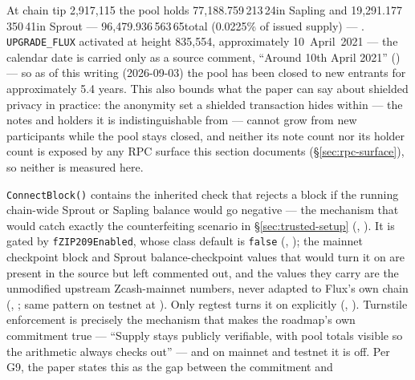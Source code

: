 \begin{description}
  At chain tip 2{,}917{,}115 the pool holds 77{,}188.759\,213\,24\flux in Sapling and 19{,}291.177\,350\,41\flux in
  Sprout — 96{,}479.936\,563\,65\flux total (0.0225\% of issued supply) —
  .
  \texttt{UPGRADE\_FLUX} activated at height 835{,}554, approximately 10~April~2021 — the calendar
  date is carried only as a source comment, ``Around 10th April 2021''
  () — so as of this
  writing (2026-09-03) the pool has been closed to new entrants for approximately 5.4 years. This
  also bounds what the paper can say about shielded privacy in practice: the anonymity set a shielded
  transaction hides within — the notes and holders it is indistinguishable from — cannot grow from new
  participants while the pool stays closed, and neither its note count nor its holder count is exposed
  by any RPC surface this section documents (\S\ref{sec:rpc-surface}), so neither is measured here.
\item[Turnstile enforcement (ZIP-209) is compiled in but dormant.] \texttt{ConnectBlock()} contains
  the inherited check that rejects a block if the running chain-wide Sprout or Sapling balance would
  go negative — the mechanism that would catch exactly the counterfeiting scenario in
  \S\ref{sec:trusted-setup} (\shipped, ). It is gated by
  \texttt{fZIP209Enabled}, whose class default is \texttt{false} (\shipped,
  ); the mainnet checkpoint block and Sprout balance-checkpoint
  values that would turn it on are present in the source but left commented out, and the values they
  carry are the unmodified upstream Zcash-mainnet numbers, never adapted to Flux's own chain (\shipped,
  ; same pattern on testnet at
  ). Only regtest turns it on explicitly (\shipped,
  ). Turnstile enforcement is precisely the mechanism that
  makes the roadmap's own commitment true — ``Supply stays publicly verifiable, with pool totals
  visible so the arithmetic always checks out''  — and on
  mainnet and testnet it is off. Per G9, the paper states this as the gap between the commitment and

\end{description}
